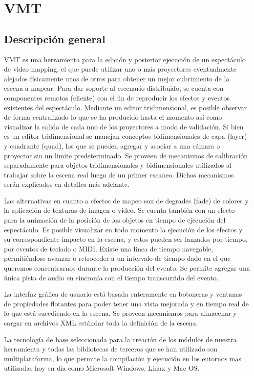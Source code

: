 ﻿\chapter{VMT}
\section{Descripción general}
VMT es una herramienta para la edición y posterior ejecución de un espectáculo de video mapping, el que puede utilizar uno o más proyectores eventualmente alejados físicamente unos de otros para obtener un mejor cubrimiento de la escena a mapear. Para dar soporte al escenario distribuido, se cuenta con componentes remotos (cliente) con el fin de reproducir los efectos y eventos existentes del espectáculo. Mediante un editor tridimensional, es posible observar de forma centralizado lo que se ha producido hasta el momento así como visualizar la salida de cada uno de los proyectores a modo de validación. Si bien es un editor tridimensional se manejan conceptos bidimensionales de capa (layer) y cuadrante (quad), los que se pueden agregar y asociar a una cámara o proyector sin un limite predeterminado. Se proveen de mecanismos de calibración separadamente para objetos tridimensionales y bidimensionales utilizados al trabajar sobre la escena real luego de un primer escaneo. Dichos mecanismos serán explicados en detalles más adelante.

Las alternativas en cuanto a efectos de mapeo son de degrades (fade) de colores y la aplicación de texturas de imagen o video. Se cuenta también con un efecto para la animación de la posición de los objetos en tiempo de ejecución del espectáculo. Es posible visualizar en todo momento la ejecución de los efectos y su correspondiente impacto en la escena, y estos pueden ser lanzados por tiempo, por eventos de teclado o MIDI. Existe una linea de tiempo navegable, permitiéndose avanzar o retroceder a un intervalo de tiempo dado en el que queremos concentrarnos durante la producción del evento. Se permite agregar una única pista de audio en sincronía con el tiempo transcurrido del evento.

La interfaz gráfica de usuario está basada enteramente en botoneras y ventanas de propiedades flotantes para poder tener una vista mejorada y en tiempo real de lo que está sucediendo en la escena. Se proveen mecanismos para almacenar y cargar en archivos XML estándar toda la definición de la escena.

La tecnología de base seleccionada para la creación de los módulos de nuestra herramienta y todas las bibliotecas de terceros que se han utilizado son multiplataforma, lo que permite la compilación y ejecución en los entornos mas utilizadas hoy en día como Microsoft Windows, Linux y Mac OS.

